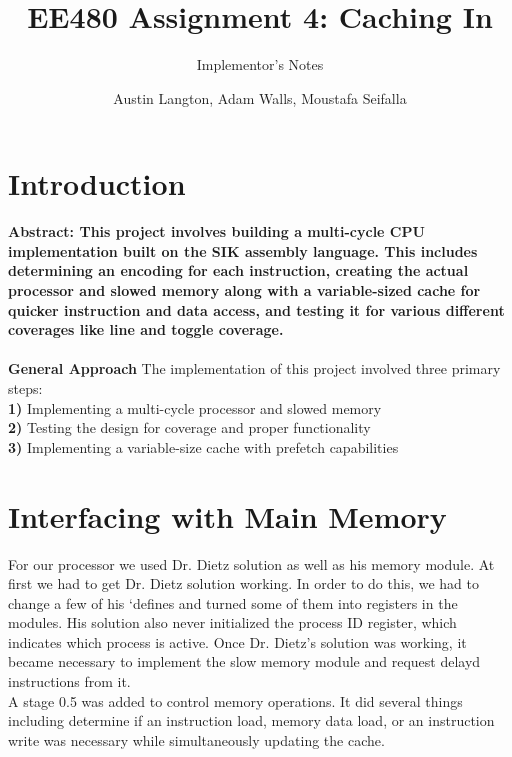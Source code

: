 \documentclass[12pt, twocolumn]{scrartcl}
\begin{document}
\title{EE480 Assignment 4: Caching In}
\subtitle {Implementor's Notes}
\author{Austin Langton, Adam Walls, Moustafa Seifalla\\
}
\maketitle

\section*{Introduction}
\textbf {Abstract: This project involves building a multi-cycle CPU implementation built on the SIK assembly language. This includes determining an encoding for each instruction, creating the actual processor and slowed memory along with a variable-sized cache for quicker instruction and data access, and testing it for various different coverages like line and toggle coverage. } 
\\
\\
\textbf{{General Approach}}
The implementation of this project involved three primary steps:\\
\textbf {1)} Implementing a multi-cycle processor and slowed memory \\
\textbf {2)} Testing the design for coverage and proper functionality \\
\textbf {3)} Implementing a variable-size cache with prefetch capabilities \\


\section*{Interfacing with Main Memory}
For our processor we used Dr. Dietz solution as well as his memory module.  At first we had to get Dr. Dietz solution working. In order to do this, we had to change a few of his `defines and turned some of them into registers in the modules. His solution also never initialized the process ID register, which indicates which process is active. Once Dr. Dietz's solution was working, it became necessary to implement the slow memory module and request delayd instructions from it. \\

A stage 0.5 was added to control memory operations. It did several things including determine if an instruction load, memory data load, or an instruction write was necessary while simultaneously updating the cache. \\
\end{document}
